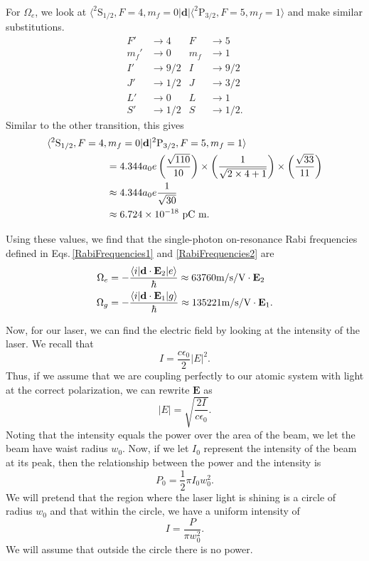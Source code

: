 For $\Omega_e$, we look at $\langle^2\mathrm{S}_{1/2},F=4,m_f=0|\mathbf{d}|\langle ^2\mathrm{P}_{3/2}, F=5, m_f=1\rangle$ and make similar substitutions. 
\begin{align}        
F'&\rightarrow4&      F&\rightarrow5\\
m_f'&\rightarrow0&    m_f&\rightarrow1\\
I'&\rightarrow9/2&    I&\rightarrow9/2\\
J'&\rightarrow1/2&    J&\rightarrow3/2\\
L'&\rightarrow0&      L&\rightarrow1\\
S'&\rightarrow1/2&    S&\rightarrow1/2.
\end{align}
Similar to the other transition, this gives 
\begin{align} 
\hspace{6em}&\hspace{-6em}\langle^2\mathrm{S}_{1/2},F=4,m_f=0|\mathbf{d}|^2\mathrm{P}_{3/2}, F=5, m_f=1\rangle\\
&=4.344a_0e\left(\frac{\sqrt{110}}{10}\right)\times\left(\frac{1}{\sqrt{2\times4+1}}\right)\times\left(\frac{\sqrt{33}}{11}\right) \\
&\approx4.344a_0e\frac{1}{\sqrt{30}}\\
&\approx6.724\times10^{-18} \textnormal{ pC m}.
\end{align}

Using these values, we find that the single-photon on-resonance Rabi frequencies defined in Eqs.\,\eqref{RabiFrequencies1} and \eqref{RabiFrequencies2} are 
\begin{align}
\label{RabiFrequenciesnumbers}
\Omega_e&=-\frac{\langle i | \mathbf{d}\cdot \mathbf{E}_2 | e\rangle}{\hbar}\approx63760 \textnormal{m/s/V}\cdot \mathbf{E}_2\\
\Omega_g&=-\frac{\langle i | \mathbf{d}\cdot \mathbf{E}_1 | g\rangle}{\hbar}\approx135221 \textnormal{m/s/V}\cdot \mathbf{E}_1.
\end{align}

Now, for our laser, we can find the electric field by looking at the intensity of the laser. We recall that 
\begin{equation}
I=\frac{c\epsilon_0}{2}|E|^2.
\end{equation}
Thus, if we assume that we are coupling perfectly to our atomic system with light at the correct polarization, we can rewrite $\mathbf{E}$ as 
\begin{equation}
|E|=\sqrt{\frac{2I}{c\epsilon_0}}.
\end{equation}
Noting that the intensity equals the power over the area of the beam, we let the beam have waist radius $w_0$. Now, if we let $I_0$ represent the intensity of the beam at its peak, then the relationship between the power and the intensity is 
\begin{equation}
P_0=\frac{1}{2}\pi I_0 w_0^2. 
\end{equation}
We will pretend that the region where the laser light is shining is a circle of radius $w_0$ and that within the circle, we have a uniform intensity of 
\begin{equation}
I=\frac{P}{\pi w_0^2}.
\end{equation}
We will assume that outside the circle there is no power. 

